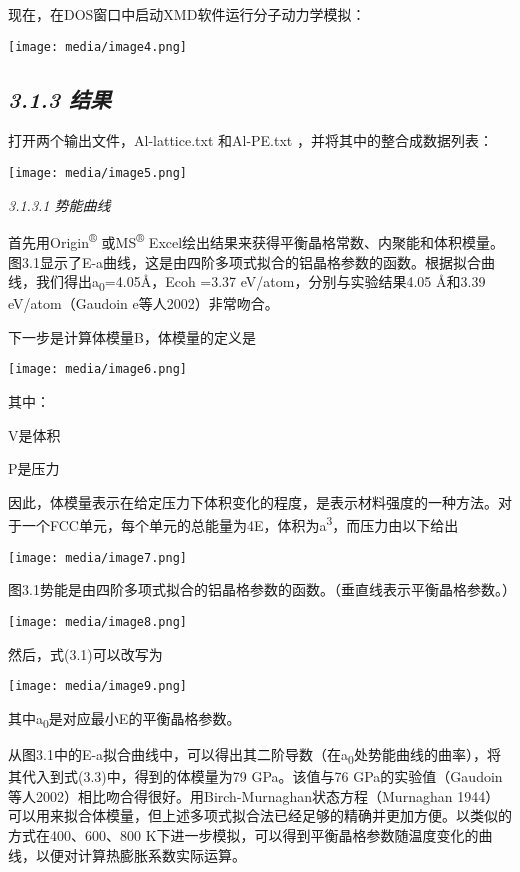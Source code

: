\documentclass[
]{article}
\begin{document}
现在，在DOS窗口中启动XMD软件运行分子动力学模拟：

\texttt{[image: media/image4.png]}

\hypertarget{ux7ed3ux679c}{%
\subsection{\texorpdfstring{\emph{3.1.3
结果}}{3.1.3 结果}}\label{ux7ed3ux679c}}

打开两个输出文件，Al-lattice.txt 和Al-PE.txt
，并将其中的整合成数据列表：

\texttt{[image: media/image5.png]}

\emph{3.1.3.1 势能曲线}

首先用Origin\textsuperscript{®} 或MS\textsuperscript{®}
Excel绘出结果来获得平衡晶格常数、内聚能和体积模量。图3.1显示了E-a曲线，这是由四阶多项式拟合的铝晶格参数的函数。根据拟合曲线，我们得出a\textsubscript{0}=4.05Å，Ecoh
=3.37 eV/atom，分别与实验结果4.05 Å和3.39 eV/atom（Gaudoin
e等人2002）非常吻合。

下一步是计算体模量B，体模量的定义是

\texttt{[image: media/image6.png]}

其中：

V是体积

P是压力

因此，体模量表示在给定压力下体积变化的程度，是表示材料强度的一种方法。对于一个FCC单元，每个单元的总能量为4E，体积为a\textsuperscript{3}，而压力由以下给出

\texttt{[image: media/image7.png]}

图3.1势能是由四阶多项式拟合的铝晶格参数的函数。（垂直线表示平衡晶格参数。）

\texttt{[image: media/image8.png]}

然后，式(3.1)可以改写为

\texttt{[image: media/image9.png]}

其中a\textsubscript{0}是对应最小E的平衡晶格参数。

从图3.1中的E-a拟合曲线中，可以得出其二阶导数（在a\textsubscript{0}处势能曲线的曲率），将其代入到式(3.3)中，得到的体模量为79
GPa。该值与76
GPa的实验值（Gaudoin等人2002）相比吻合得很好。用Birch-Murnaghan状态方程（Murnaghan
1944）可以用来拟合体模量，但上述多项式拟合法已经足够的精确并更加方便。以类似的方式在400、600、800
K下进一步模拟，可以得到平衡晶格参数随温度变化的曲线，以便对计算热膨胀系数实际运算。
\end{document}
